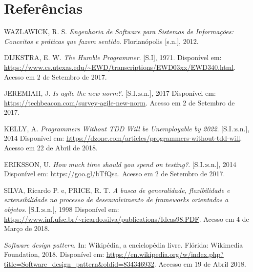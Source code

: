 \documentclass[
    12pt,       %
    openright,      %
    twoside,      %
    a4paper,      %
    english,      %
    french,       %
    spanish,      %
    brazil,       %
    ]{abntex2}
\begin{document}
  \chapter*{Referências}
  \noindent
  WAZLAWICK, R. S. \textit{Engenharia de Software para Sistemas de Informações: Conceitos e práticas que fazem sentido}. Florianópolis [s.n.], 2012.

  \noindent
  DIJKSTRA, E. W. \textit{The Humble Programmer}. [S.I], 1971. Disponível em:
  \url{https://www.cs.utexas.edu/~EWD/transcriptions/EWD03xx/EWD340.html}.
  Acesso em 2 de Setembro de 2017.

  \noindent
  JEREMIAH, J. \textit{Is agile the new norm?}. [S.I.:s.n.], 2017 Disponível em:
  \url{https://techbeacon.com/survey-agile-new-norm}. Acesso em 2 de Setembro de 2017.

  \noindent
  KELLY, A. \textit{Programmers Without TDD Will be Unemployable by 2022}. [S.I.:s.n.],
  2014 Disponível em: \url{https://dzone.com/articles/programmers-without-tdd-will}. Acesso em 22 de Abril de 2018.

  \noindent
  ERIKSSON, U. \textit{How much time should you spend on testing?}. [S.I.:s.n.], 2014 Disponível em:
  \url{https://goo.gl/bTfQsa}. Acesso em 2 de Setembro de 2017.

  \noindent
  SILVA, Ricardo P. e, PRICE, R. T. \textit{A busca de generalidade, flexibilidade e extensibilidade no processo de desenvolvimento de frameworks orientados a objetos}. [S.I.:s.n.], 1998 Disponível em: \url{https://www.inf.ufsc.br/~ricardo.silva/publications/Ideas98.PDF}. Acesso em 4 de Março de 2018.

  \noindent
  \textit{Software design pattern}. In: Wikipédia, a enciclopédia livre. Flórida: Wikimedia Foundation,
  2018. Disponível em:
  \url{https://en.wikipedia.org/w/index.php?title=Software_design_pattern&oldid=834346932}. Accesso
  em 19 de Abril 2018.


\end{document}
